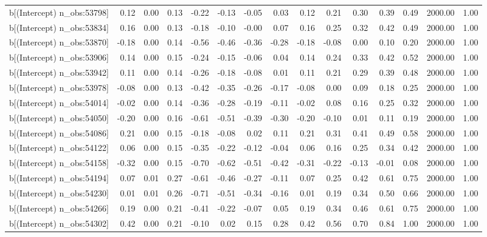 \begin{table}[ht]
\begin{tabular}{rrrrrrrrrrrrrrr}
  b[(Intercept) n\_obs:53798] & 0.12 & 0.00 & 0.13 & -0.22 & -0.13 & -0.05 & 0.03 & 0.12 & 0.21 & 0.30 & 0.39 & 0.49 & 2000.00 & 1.00 \\ 
  b[(Intercept) n\_obs:53834] & 0.16 & 0.00 & 0.13 & -0.18 & -0.10 & -0.00 & 0.07 & 0.16 & 0.25 & 0.32 & 0.42 & 0.49 & 2000.00 & 1.00 \\ 
  b[(Intercept) n\_obs:53870] & -0.18 & 0.00 & 0.14 & -0.56 & -0.46 & -0.36 & -0.28 & -0.18 & -0.08 & 0.00 & 0.10 & 0.20 & 2000.00 & 1.00 \\ 
  b[(Intercept) n\_obs:53906] & 0.14 & 0.00 & 0.15 & -0.24 & -0.15 & -0.06 & 0.04 & 0.14 & 0.24 & 0.33 & 0.42 & 0.52 & 2000.00 & 1.00 \\ 
  b[(Intercept) n\_obs:53942] & 0.11 & 0.00 & 0.14 & -0.26 & -0.18 & -0.08 & 0.01 & 0.11 & 0.21 & 0.29 & 0.39 & 0.48 & 2000.00 & 1.00 \\ 
  b[(Intercept) n\_obs:53978] & -0.08 & 0.00 & 0.13 & -0.42 & -0.35 & -0.26 & -0.17 & -0.08 & 0.00 & 0.09 & 0.18 & 0.25 & 2000.00 & 1.00 \\ 
  b[(Intercept) n\_obs:54014] & -0.02 & 0.00 & 0.14 & -0.36 & -0.28 & -0.19 & -0.11 & -0.02 & 0.08 & 0.16 & 0.25 & 0.32 & 2000.00 & 1.00 \\ 
  b[(Intercept) n\_obs:54050] & -0.20 & 0.00 & 0.16 & -0.61 & -0.51 & -0.39 & -0.30 & -0.20 & -0.10 & 0.01 & 0.11 & 0.19 & 2000.00 & 1.00 \\ 
  b[(Intercept) n\_obs:54086] & 0.21 & 0.00 & 0.15 & -0.18 & -0.08 & 0.02 & 0.11 & 0.21 & 0.31 & 0.41 & 0.49 & 0.58 & 2000.00 & 1.00 \\ 
  b[(Intercept) n\_obs:54122] & 0.06 & 0.00 & 0.15 & -0.35 & -0.22 & -0.12 & -0.04 & 0.06 & 0.16 & 0.25 & 0.34 & 0.42 & 2000.00 & 1.00 \\ 
  b[(Intercept) n\_obs:54158] & -0.32 & 0.00 & 0.15 & -0.70 & -0.62 & -0.51 & -0.42 & -0.31 & -0.22 & -0.13 & -0.01 & 0.08 & 2000.00 & 1.00 \\ 
  b[(Intercept) n\_obs:54194] & 0.07 & 0.01 & 0.27 & -0.61 & -0.46 & -0.27 & -0.11 & 0.07 & 0.25 & 0.42 & 0.61 & 0.75 & 2000.00 & 1.00 \\ 
  b[(Intercept) n\_obs:54230] & 0.01 & 0.01 & 0.26 & -0.71 & -0.51 & -0.34 & -0.16 & 0.01 & 0.19 & 0.34 & 0.50 & 0.66 & 2000.00 & 1.00 \\ 
  b[(Intercept) n\_obs:54266] & 0.19 & 0.00 & 0.21 & -0.41 & -0.22 & -0.07 & 0.05 & 0.19 & 0.34 & 0.46 & 0.61 & 0.75 & 2000.00 & 1.00 \\ 
  b[(Intercept) n\_obs:54302] & 0.42 & 0.00 & 0.21 & -0.10 & 0.02 & 0.15 & 0.28 & 0.42 & 0.56 & 0.70 & 0.84 & 1.00 & 2000.00 & 1.00 \\ 

\end{tabular}
\end{table}
